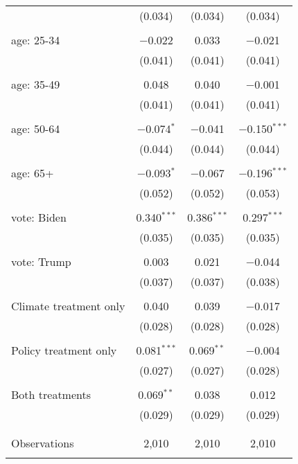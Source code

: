 \begin{tabular}{@{\extracolsep{5pt}}lccc}
  & (0.034) & (0.034) & (0.034) \\ 
  & & & \\ 
 age: 25-34 & $-$0.022 & 0.033 & $-$0.021 \\ 
  & (0.041) & (0.041) & (0.041) \\ 
  & & & \\ 
 age: 35-49 & 0.048 & 0.040 & $-$0.001 \\ 
  & (0.041) & (0.041) & (0.041) \\ 
  & & & \\ 
 age: 50-64 & $-$0.074$^{*}$ & $-$0.041 & $-$0.150$^{***}$ \\ 
  & (0.044) & (0.044) & (0.044) \\ 
  & & & \\ 
 age: 65+ & $-$0.093$^{*}$ & $-$0.067 & $-$0.196$^{***}$ \\ 
  & (0.052) & (0.052) & (0.053) \\ 
  & & & \\ 
 vote: Biden & 0.340$^{***}$ & 0.386$^{***}$ & 0.297$^{***}$ \\ 
  & (0.035) & (0.035) & (0.035) \\ 
  & & & \\ 
 vote: Trump & 0.003 & 0.021 & $-$0.044 \\ 
  & (0.037) & (0.037) & (0.038) \\ 
  & & & \\ 
 Climate treatment only & 0.040 & 0.039 & $-$0.017 \\ 
  & (0.028) & (0.028) & (0.028) \\ 
  & & & \\ 
 Policy treatment only & 0.081$^{***}$ & 0.069$^{**}$ & $-$0.004 \\ 
  & (0.027) & (0.027) & (0.028) \\ 
  & & & \\ 
 Both treatments & 0.069$^{**}$ & 0.038 & 0.012 \\ 
  & (0.029) & (0.029) & (0.029) \\ 
  & & & \\ 
\hline \\[-1.8ex] 

Observations & 2,010 & 2,010 & 2,010 \\ 
\hline 
\hline \\[-1.8ex] 
\end{tabular} 